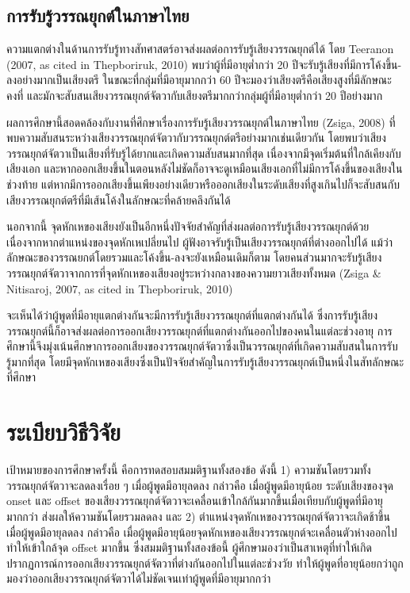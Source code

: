 \documentclass[a4paper]{article}
\begin{document}
\subsection{การรับรู้วรรณยุกต์ในภาษาไทย}
    ความแตกต่างในด้านการรับรู้ทางสัทศาสตร์อาจส่งผลต่อการรับรู้เสียงวรรณยุกต์ได้ โดย Teeranon (2007, as cited in Thepboriruk, 2010) พบว่าผู้ที่มีอายุต่ำกว่า 20 ปีจะรับรู้เสียงที่มีการโค้งขึ้น-ลงอย่างมากเป็นเสียงตรี ในขณะที่กลุ่มที่มีอายุมากกว่า 60 ปีจะมองว่าเสียงตรีคือเสียงสูงที่มีลักษณะคงที่ และมักจะสับสนเสียงวรรณยุกต์จัตวากับเสียงตรีมากกว่ากลุ่มผู้ที่มีอายุต่ำกว่า 20 ปีอย่างมาก

    ผลการศึกษานี้สอดคล้องกับงานที่ศึกษาเรื่องการรับรู้เสียงวรรณยุกต์ในภาษาไทย (Zsiga, 2008) ที่พบความสับสนระหว่างเสียงวรรณยุกต์จัตวากับวรรณยุกต์ตรีอย่างมากเช่นเดียวกัน โดยพบว่าเสียงวรรณยุกต์จัตวาเป็นเสียงที่รับรู้ได้ยากและเกิดความสับสนมากที่สุด เนื่องจากมีจุดเริ่มต้นที่ใกล้เคียงกับเสียงเอก และหากออกเสียงขึ้นในตอนหลังไม่ชัดก็อาจจะดูเหมือนเสียงเอกที่ไม่มีการโค้งขึ้นของเสียงในช่วงท้าย แต่หากมีการออกเสียงขึ้นเพียงอย่างเดียวหรือออกเสียงในระดับเสียงที่สูงเกินไปก็จะสับสนกับเสียงวรรณยุกต์ตรีที่มีเส้นโค้งในลักษณะที่คล้ายคลึงกันได้

    นอกจากนี้ จุดหักเหของเสียงยังเป็นอีกหนึ่งปัจจัยสำคัญที่ส่งผลต่อการรับรู้เสียงวรรณยุกต์ด้วย เนื่องจากหากตำแหน่งของจุดหักเหเปลี่ยนไป ผู้ฟังอาจรับรู้เป็นเสียงวรรณยุกต์ที่ต่างออกไปได้ แม้ว่าลักษณะของวรรณยกต์โดยรวมและโค้งขึ้น-ลงจะยังเหมือนเดิมก็ตาม โดยคนส่วนมากจะรับรู้เสียงวรรณยุกต์จัตวาจากการที่จุดหักเหของเสียงอยู่ระหว่างกลางของความยาวเสียงทั้งหมด (Zsiga \& Nitisaroj, 2007, as cited in Thepboriruk, 2010)

    จะเห็นได้ว่าผู้พูดที่มีอายุแตกต่างกันจะมีการรับรู้เสียงวรรณยุกต์ที่แตกต่างกันได้ ซึ่งการรับรู้เสียงวรรณยุกต์นี้ก็อาจส่งผลต่อการออกเสียงวรรณยุกต์ที่แตกต่างกันออกไปของคนในแต่ละช่วงอายุ การศึกษานี้จึงมุ่งเน้นศึกษาการออกเสียงของวรรณยุกต์จัตวาซึ่งเป็นวรรณยุกต์ที่เกิดความสับสนในการรับรู้มากที่สุด โดยมีจุดหักเหของเสียงซึ่งเป็นปัจจัยสำคัญในการรับรู้เสียงวรรณยุกต์เป็นหนึ่งในสัทลักษณะที่ศึกษา
\section{ระเบียบวิธีวิจัย}
    เป้าหมายของการศึกษาครั้งนี้ คือการทดสอบสมมติฐานทั้งสองข้อ ดังนี้ 1) ความชันโดยรวมทั้งวรรณยุกต์จัตวาจะลดลงเรื่อย ๆ เมื่อผู้พูดมีอายุลดลง กล่าวคือ เมื่อผู้พูดมีอายุน้อย ระดับเสียงของจุด onset และ offset ของเสียงวรรณยุกต์จัตวาจะเคลื่อนเข้าใกล้กันมากขึ้นเมื่อเทียบกับผู้พูดที่มีอายุมากกว่า ส่งผลให้ความชันโดยรวมลดลง และ 2)  ตำแหน่งจุดหักเหของวรรณยุกต์จัตวาจะเกิดช้าขึ้น เมื่อผู้พูดมีอายุลดลง กล่าวคือ เมื่อผู้พูดมีอายุน้อยจุดหักเหของเสียงวรรณยุกต์จะเคลื่อนตัวห่างออกไป ทำให้เข้าใกล้จุด offset มากขึ้น ซึ่งสมมติฐานทั้งสองข้อนี้ ผู้ศึกษามองว่าเป็นสาเหตุที่ทำให้เกิดปรากฏการณ์การออกเสียงวรรณยุกต์จัตวาที่ต่างกันออกไปในแต่ละช่วงวัย ทำให้ผู้พูดที่อายุน้อยกว่าถูกมองว่าออกเสียงวรรณยุกต์จัตวาได้ไม่ชัดเจนเท่าผู้พูดที่มีอายุมากกว่า
\end{document}
